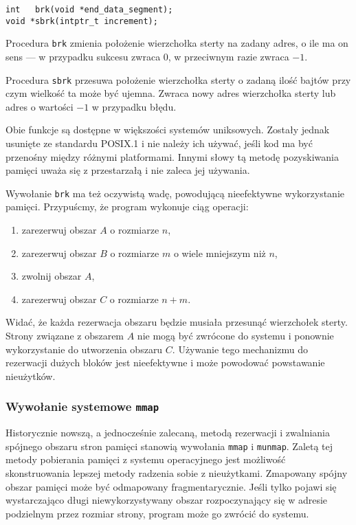 \documentclass[12pt,a4paper,titlepage,twoside]{mwart}
\begin{document}
\vspace{4ex}

\begin{lstlisting}[caption={Prototypy procedur \texttt{brk} i \texttt{sbrk}.}]
int   brk(void *end_data_segment);
void *sbrk(intptr_t increment);
\end{lstlisting}

Procedura \texttt{brk} zmienia położenie wierzchołka sterty na zadany adres, o
ile ma on sens --- w przypadku sukcesu zwraca $0$, w przeciwnym razie zwraca $-1$.

Procedura \texttt{sbrk} przesuwa położenie wierzchołka sterty o zadaną ilość
bajtów przy czym wielkość ta może być ujemna. Zwraca nowy adres wierzchołka
sterty lub adres o wartości $-1$ w przypadku błędu.

Obie funkcje są dostępne w większości systemów uniksowych. Zostały jednak
usunięte ze standardu POSIX.1 i nie należy ich używać, jeśli kod ma być
przenośny między różnymi platformami. Innymi słowy tą metodę pozyskiwania
pamięci uważa się z przestarzałą i nie zaleca jej używania.

Wywołanie \texttt{brk} ma też oczywistą wadę, powodującą nieefektywne
wykorzystanie pamięci. Przypuścmy, że program wykonuje ciąg operacji:

\begin{enumerate}
\item zarezerwuj obszar $A$ o rozmiarze $n$,
\item zarezerwuj obszar $B$ o rozmiarze $m$ o wiele mniejszym niż $n$,
\item zwolnij obszar $A$,
\item zarezerwuj obszar $C$ o rozmiarze $n + m$.
\end{enumerate}

Widać, że każda rezerwacja obszaru będzie musiała przesunąć wierzchołek sterty.
Strony związane z obszarem $A$ nie mogą być zwrócone do systemu i ponownie
wykorzystanie do utworzenia obszaru $C$. Używanie tego mechanizmu do rezerwacji
dużych bloków jest nieefektywne i może powodować powstawanie nieużytków.

\subsubsection{Wywołanie systemowe \texttt{mmap}}

Historycznie nowszą, a jednocześnie zalecaną, metodą rezerwacji i zwalniania
spójnego obszaru stron pamięci stanowią wywołania \texttt{mmap} i
\texttt{munmap}. Zaletą tej metody pobierania pamięci z systemu operacyjnego
jest możliwość skonstruowania lepszej metody radzenia sobie z nieużytkami.
Zmapowany spójny obszar pamięci może być odmapowany fragmentarycznie. Jeśli
tylko pojawi się wystarczająco długi niewykorzystywany obszar rozpoczynający
się w adresie podzielnym przez rozmiar strony, program może go zwrócić do
systemu. 
\end{document}
